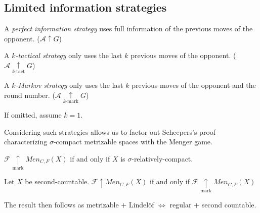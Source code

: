 \documentclass{beamer}
\theoremstyle{example}
\theoremstyle{definition}
\newcommand{\win}{\uparrow}
\newcommand{\markwin}{\underset{\text{mark}}{\uparrow}}
\newcommand{\kmarkwin}[1]{\underset{#1\text{-mark}}{\uparrow}}
\newcommand{\ktactwin}[1]{\underset{#1\text{-tact}}{\uparrow}}
\newcommand{\menGame}[1]{Men_{C,F}\left({#1}\right)}
\newcommand{\<}{\langle}
\renewcommand{\>}{\rangle}
\newcommand{\pl}[1]{\mathscr{#1}}
\newcommand{\term}{\textit}
\begin{document}
\subsection{Limited information strategies}

\begin{frame}

  \begin{definition}
    A \term{perfect information strategy} uses full information of the
    previous moves of the opponent. (\(\pl A\win G\))
  \end{definition}

  \pause

  \begin{definition}
    A \term{$k$-tactical strategy} only uses the last \(k\)
    previous moves of the opponent. (\(\pl A\ktactwin{k} G\))
  \end{definition}

  \pause

  \begin{definition}
    A \term{$k$-Markov strategy} only uses the last \(k\)
    previous moves of the opponent and the round number.
    (\(\pl A\kmarkwin{k} G\))
  \end{definition}

  \pause

  If omitted, assume \(k=1\).

\end{frame}

\begin{frame}\small
  Considering such strategies allows us to factor out Scheepers's proof
  characterizing \(\sigma\)-compact metrizable spaces with the Menger
  game.

  \pause

  \begin{lemma}
    \(\pl F\markwin\menGame X\) if and only if \(X\) is
    \(\sigma\)-relatively-compact.
  \end{lemma}

  \pause

  \begin{lemma}
    Let \(X\) be second-countable.
    \(\pl F\win\menGame X\) if and only if
    \(\pl F\markwin\menGame X\)
  \end{lemma}

  \pause

  The result then follows as metrizable \(+\) Lindel\"of
  \(\Leftrightarrow\) regular \(+\) second countable.
\end{frame}
\end{document}
